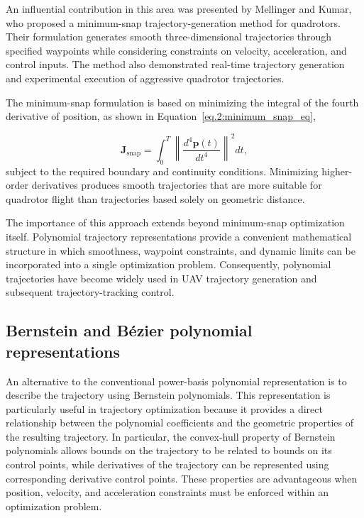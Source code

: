 An influential contribution in this area was presented by Mellinger and Kumar, who proposed a minimum-snap trajectory-generation method for quadrotors. Their formulation generates smooth three-dimensional trajectories through specified waypoints while considering constraints on velocity, acceleration, and control inputs. The method also demonstrated real-time trajectory generation and experimental execution of aggressive quadrotor trajectories. \cite{mellingerMinimumSnapTrajectory2011}

The minimum-snap formulation is based on minimizing the integral of the fourth derivative of position, as shown in Equation~\eqref{eq.2:minimum_snap_eq},

\begin{equation}
\mathbf{J}_{\mathrm{snap}}
=
\int_{0}^{T}
\left\|
\frac{d^{4}\mathbf{p}(t)}{dt^{4}}
\right\|^{2}dt,
\label{eq.2:minimum_snap_eq}
\end{equation}
subject to the required boundary and continuity conditions. Minimizing higher-order derivatives produces smooth trajectories that are more suitable for quadrotor flight than trajectories based solely on geometric distance.

The importance of this approach extends beyond minimum-snap optimization itself. Polynomial trajectory representations provide a convenient mathematical structure in which smoothness, waypoint constraints, and dynamic limits can be incorporated into a single optimization problem. Consequently, polynomial trajectories have become widely used in UAV trajectory generation and subsequent trajectory-tracking control.

\subsection{Bernstein and Bézier polynomial representations} \label{subsec.2:Bernstein_polynomials}

An alternative to the conventional power-basis polynomial representation is to describe the trajectory using Bernstein polynomials. This representation is particularly useful in trajectory optimization because it provides a direct relationship between the polynomial coefficients and the geometric properties of the resulting trajectory. In particular, the convex-hull property of Bernstein polynomials allows bounds on the trajectory to be related to bounds on its control points, while derivatives of the trajectory can be represented using corresponding derivative control points. These properties are advantageous when position, velocity, and acceleration constraints must be enforced within an optimization problem.

